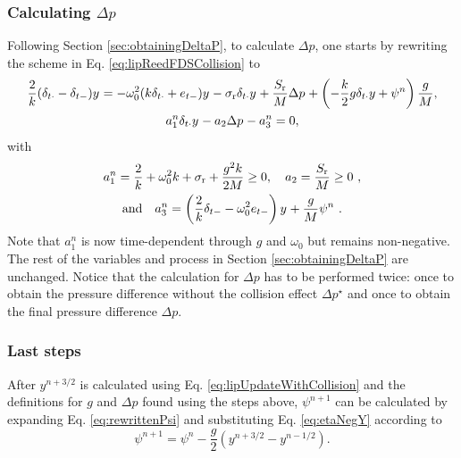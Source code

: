 \subsubsection{Calculating $\Delta p$}
Following Section \ref{sec:obtainingDeltaP}, to calculate $\Delta p$, one starts by rewriting the scheme in Eq. \eqref{eq:lipReedFDSCollision} to
\begin{gather*}
    \frac{2}{k} (\delta_{t\cdot} - \delta_{t-})y^{} = -\omega_0^2(k\delta_{t\cdot} + e_{t-})y^{} - \sigma_\text{r}\delta_{t\cdot} y^{} + \frac{S_\text{r}}{M}\Delta p^{} + \left(-\frac{k}{2}g\delta_{t\cdot}y+\psi^n\right)\frac{g}{M},\\
    a_1^n\delta_{t\cdot}y^{} - a_2\Delta p^{} - a_3^n = 0,
\end{gather*}
with 
\begin{equation*}
    \begin{gathered}
    a_1^n = \frac{2}{k} + \omega_0^2k + \sigma_\text{r} + \frac{g^2k}{2M} \geq 0, \quad a_2 = \frac{S_\text{r}}{M} \geq 0\ , \\
     \text{and} \quad a_3^n = \left(\frac{2}{k} \delta_{t-} - \omega_0^2e_{t-}\right)y^{} + \frac{g}{M}\psi^n\ .
    \end{gathered}
\end{equation*}
Note that $a_1^n$ is now time-dependent through $g$ and $\omega_0$ but remains non-negative. The rest of the variables and process in Section \ref{sec:obtainingDeltaP} are unchanged. Notice that the calculation for $\Delta p$ has to be performed twice: once to obtain the pressure difference without the collision effect $\Delta p^\star$ and once to obtain the final pressure difference $\Delta p$.

\subsubsection{Last steps}
After $y^{n+3/2}$ is calculated using Eq. \eqref{eq:lipUpdateWithCollision} and the definitions for $g$ and $\Delta p$ found using the steps above, $\psi^{n+1}$ can be calculated by expanding Eq. \eqref{eq:rewrittenPsi} and substituting Eq. \eqref{eq:etaNegY} according to
\begin{equation}\label{eq:psiUpdate}
    \psi^{n+1} = \psi^n - \frac{g}{2}\left(y^{n+3/2} - y^{n-1/2}\right).
\end{equation}

